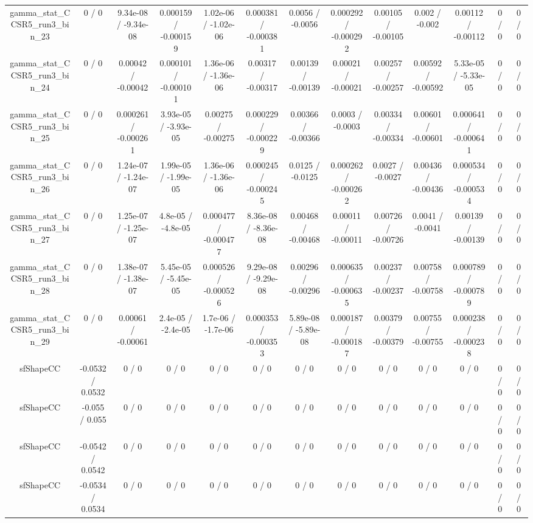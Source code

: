 \documentclass[10pt]{article}
\begin{document}
\begin{table}[htbp]
\begin{center}
\begin{tabular}{|c|c|c|c|c|c|c|c|c|c|c|c|c|}
  gamma_stat_CCSR5_run3_bin_23 & 0 / 0 & 9.34e-08 / -9.34e-08 & 0.000159 / -0.000159 & 1.02e-06 / -1.02e-06 & 0.000381 / -0.000381 & 0.0056 / -0.0056 & 0.000292 / -0.000292 & 0.00105 / -0.00105 & 0.002 / -0.002 & 0.00112 / -0.00112 & 0 / 0 & 0 / 0 \\ 
  gamma_stat_CCSR5_run3_bin_24 & 0 / 0 & 0.00042 / -0.00042 & 0.000101 / -0.000101 & 1.36e-06 / -1.36e-06 & 0.00317 / -0.00317 & 0.00139 / -0.00139 & 0.00021 / -0.00021 & 0.00257 / -0.00257 & 0.00592 / -0.00592 & 5.33e-05 / -5.33e-05 & 0 / 0 & 0 / 0 \\ 
  gamma_stat_CCSR5_run3_bin_25 & 0 / 0 & 0.000261 / -0.000261 & 3.93e-05 / -3.93e-05 & 0.00275 / -0.00275 & 0.000229 / -0.000229 & 0.00366 / -0.00366 & 0.0003 / -0.0003 & 0.00334 / -0.00334 & 0.00601 / -0.00601 & 0.000641 / -0.000641 & 0 / 0 & 0 / 0 \\ 
  gamma_stat_CCSR5_run3_bin_26 & 0 / 0 & 1.24e-07 / -1.24e-07 & 1.99e-05 / -1.99e-05 & 1.36e-06 / -1.36e-06 & 0.000245 / -0.000245 & 0.0125 / -0.0125 & 0.000262 / -0.000262 & 0.0027 / -0.0027 & 0.00436 / -0.00436 & 0.000534 / -0.000534 & 0 / 0 & 0 / 0 \\ 
  gamma_stat_CCSR5_run3_bin_27 & 0 / 0 & 1.25e-07 / -1.25e-07 & 4.8e-05 / -4.8e-05 & 0.000477 / -0.000477 & 8.36e-08 / -8.36e-08 & 0.00468 / -0.00468 & 0.00011 / -0.00011 & 0.00726 / -0.00726 & 0.0041 / -0.0041 & 0.00139 / -0.00139 & 0 / 0 & 0 / 0 \\ 
  gamma_stat_CCSR5_run3_bin_28 & 0 / 0 & 1.38e-07 / -1.38e-07 & 5.45e-05 / -5.45e-05 & 0.000526 / -0.000526 & 9.29e-08 / -9.29e-08 & 0.00296 / -0.00296 & 0.000635 / -0.000635 & 0.00237 / -0.00237 & 0.00758 / -0.00758 & 0.000789 / -0.000789 & 0 / 0 & 0 / 0 \\ 
  gamma_stat_CCSR5_run3_bin_29 & 0 / 0 & 0.00061 / -0.00061 & 2.4e-05 / -2.4e-05 & 1.7e-06 / -1.7e-06 & 0.000353 / -0.000353 & 5.89e-08 / -5.89e-08 & 0.000187 / -0.000187 & 0.00379 / -0.00379 & 0.00755 / -0.00755 & 0.000238 / -0.000238 & 0 / 0 & 0 / 0 \\ 
  sfShapeCC & -0.0532 / 0.0532 & 0 / 0 & 0 / 0 & 0 / 0 & 0 / 0 & 0 / 0 & 0 / 0 & 0 / 0 & 0 / 0 & 0 / 0 & 0 / 0 & 0 / 0 \\ 
  sfShapeCC & -0.055 / 0.055 & 0 / 0 & 0 / 0 & 0 / 0 & 0 / 0 & 0 / 0 & 0 / 0 & 0 / 0 & 0 / 0 & 0 / 0 & 0 / 0 & 0 / 0 \\ 
  sfShapeCC & -0.0542 / 0.0542 & 0 / 0 & 0 / 0 & 0 / 0 & 0 / 0 & 0 / 0 & 0 / 0 & 0 / 0 & 0 / 0 & 0 / 0 & 0 / 0 & 0 / 0 \\ 
  sfShapeCC & -0.0534 / 0.0534 & 0 / 0 & 0 / 0 & 0 / 0 & 0 / 0 & 0 / 0 & 0 / 0 & 0 / 0 & 0 / 0 & 0 / 0 & 0 / 0 & 0 / 0 \\ 

\end{tabular}
\end{center}
\end{table}
\end{document}
